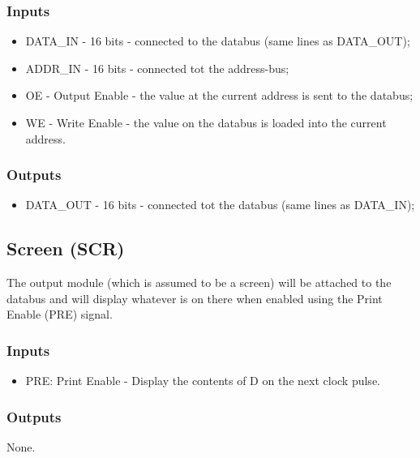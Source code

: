 \subsubsection*{Inputs}
\begin{itemize}
\item DATA\_IN - 16 bits - connected to the databus (same lines as DATA\_OUT);
\item ADDR\_IN - 16 bits - connected tot the address-bus;
\item OE - Output Enable - the value at the current address is sent to the databus;
\item WE - Write Enable - the value on the databus is loaded into the current address.
\end{itemize}

\subsubsection*{Outputs}
\begin{itemize}
\item DATA\_OUT - 16 bits - connected tot the databus (same lines as DATA\_IN);
\end{itemize}

\subsection{Screen (SCR)}  \label{sec:architecture:scr}
The output module (which is assumed to be a screen) will be attached to the databus and will display whatever is on there when enabled using the Print Enable (PRE) signal.
\subsubsection*{Inputs}
\begin{itemize}
\item PRE: Print Enable - Display the contents of D on the next clock pulse.
\end{itemize}

\subsubsection*{Outputs}
None.


